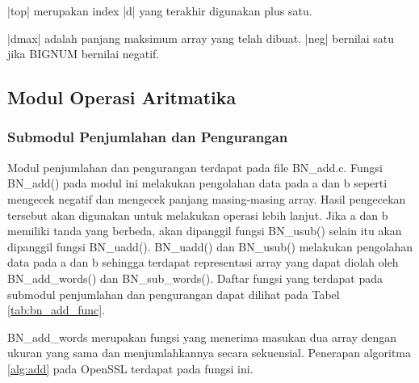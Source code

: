     |top| merupakan index |d| yang terakhir digunakan plus satu.

    |dmax| adalah panjang maksimum array yang telah dibuat. |neg| bernilai satu jika BIGNUM bernilai negatif.


  \subsection{Modul Operasi Aritmatika}
    \subsubsection{Submodul Penjumlahan dan Pengurangan}
      Modul penjumlahan dan pengurangan terdapat pada file BN\_add.c. Fungsi BN\_add() pada modul ini melakukan pengolahan data pada a dan b seperti mengecek negatif dan mengecek panjang masing-masing array. Hasil pengecekan tersebut akan digunakan untuk melakukan operasi lebih lanjut. Jika a dan b memiliki tanda yang berbeda, akan dipanggil fungsi BN\_usub() selain itu akan dipanggil fungsi BN\_uadd(). BN\_uadd() dan BN\_usub() melakukan pengolahan data pada a dan b sehingga terdapat representasi array yang dapat diolah oleh BN\_add\_words() dan BN\_sub\_words(). Daftar fungsi yang terdapat pada submodul penjumlahan dan pengurangan dapat dilihat pada Tabel \ref{tab:bn_add_func}.

      BN\_add\_words merupakan fungsi yang menerima masukan dua array dengan ukuran yang sama dan menjumlahkannya secara sekuensial. Penerapan algoritma \ref{alg:add} pada OpenSSL terdapat pada fungsi ini.

